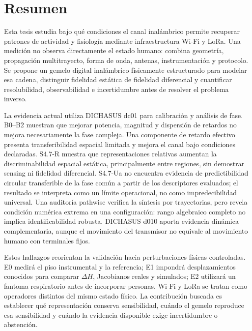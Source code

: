 \chapter*{Resumen}

Esta tesis estudia bajo qué condiciones el canal inalámbrico permite recuperar patrones de actividad y fisiología mediante infraestructura Wi-Fi y LoRa. Una medición no observa directamente el estado humano: combina geometría, propagación multitrayecto, forma de onda, antenas, instrumentación y protocolo. Se propone un gemelo digital inalámbrico físicamente estructurado para modelar esa cadena, distinguir fidelidad estática de fidelidad diferencial y cuantificar resolubilidad, observabilidad e incertidumbre antes de resolver el problema inverso.

La evidencia actual utiliza DICHASUS dc01 para calibración y análisis de fase. B0--B2 muestran que mejorar potencia, magnitud y dispersión de retardos no mejora necesariamente la fase compleja. Una componente de retardo efectivo presenta transferibilidad espacial limitada y mejora el canal bajo condiciones declaradas. S4.7-R muestra que representaciones relativas aumentan la discriminabilidad espacial estática, principalmente entre regiones, sin demostrar sensing ni fidelidad diferencial. S4.7-Ua no encuentra evidencia de predictibilidad circular transferible de la fase común a partir de los descriptores evaluados; el resultado se interpreta como un límite operacional, no como impredecibilidad universal. Una auditoría pathwise verifica la síntesis por trayectorias, pero revela condición numérica extrema en una configuración: rango algebraico completo no implica identificabilidad robusta. DICHASUS d010 aporta evidencia dinámica complementaria, aunque el movimiento del transmisor no equivale al movimiento humano con terminales fijos.

Estos hallazgos reorientan la validación hacia perturbaciones físicas controladas. E0 medirá el piso instrumental y la referencia; E1 impondrá desplazamientos conocidos para comparar $\Delta H$, Jacobianos reales y simulados; E2 utilizará un fantoma respiratorio antes de incorporar personas. Wi-Fi y LoRa se tratan como operadores distintos del mismo estado físico. La contribución buscada es establecer qué representación conserva sensibilidad, cuándo el gemelo reproduce esa sensibilidad y cuándo la evidencia disponible exige incertidumbre o abstención.
